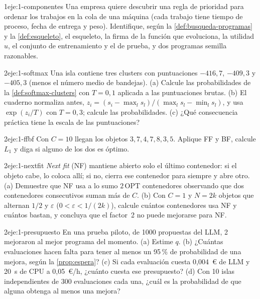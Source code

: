 \begin{ejercicio}{1}{eje:1-componentes}
Una empresa quiere descubrir una regla de prioridad para ordenar los trabajos en la cola de una máquina (cada trabajo tiene tiempo de proceso, fecha de entrega y peso). Identifique, según la \cref{def:busqueda-programas} y la \cref{def:esqueleto}, el esqueleto, la firma de la función que evoluciona, la utilidad $u$, el conjunto de entrenamiento y el de prueba, y dos programas semilla razonables.
\end{ejercicio}

\begin{ejercicio}{2}{eje:1-softmax}
Una isla contiene tres clusters con puntuaciones $-416{,}7$, $-409{,}3$ y $-405{,}3$ (menos el número medio de bandejas). (a) Calcule las probabilidades de la \cref{def:softmax-clusters} con $T=0{,}1$ aplicada a las puntuaciones brutas. (b) El cuaderno normaliza antes, $z_i=(s_i-\max_l s_l)/(\max_l s_l-\min_l s_l)$, y usa $\exp(z_i/T)$ con $T=0{,}3$; calcule las probabilidades. (c) ¿Qué consecuencia práctica tiene la escala de las puntuaciones?
\end{ejercicio}

\begin{ejercicio}{2}{eje:1-ffbf}
Con $C=10$ llegan los objetos $3,7,4,7,8,3,5$. Aplique FF y BF, calcule $L_1$ y diga si alguno de los dos es óptimo.
\end{ejercicio}

\begin{ejercicio}{2}{eje:1-nextfit}
\emph{Next fit} (NF) mantiene abierto solo el último contenedor: si el objeto cabe, lo coloca allí; si no, cierra ese contenedor para siempre y abre otro. (a) Demuestre que NF usa a lo sumo $2\,\mathrm{OPT}$ contenedores observando que dos contenedores consecutivos suman más de $C$. (b) Con $C=1$ y $N=2k$ objetos que alternan $1/2$ y $\varepsilon$ ($0<\varepsilon<1/(2k)$), calcule cuántos contenedores usa NF y cuántos bastan, y concluya que el factor~2 no puede mejorarse para NF.
\end{ejercicio}

\begin{ejercicio}{2}{eje:1-presupuesto}
En una prueba piloto, de 1000 propuestas del LLM, 2 mejoraron al mejor programa del momento. (a) Estime $q$. (b) ¿Cuántas evaluaciones hacen falta para tener al menos un 95\,\% de probabilidad de una mejora, según la \cref{prop:espera}? (c) Si cada evaluación cuesta 0{,}004~€ de LLM y 20~s de CPU a 0{,}05~€/h, ¿cuánto cuesta ese presupuesto? (d) Con 10 islas independientes de 300 evaluaciones cada una, ¿cuál es la probabilidad de que alguna obtenga al menos una mejora?
\end{ejercicio}

